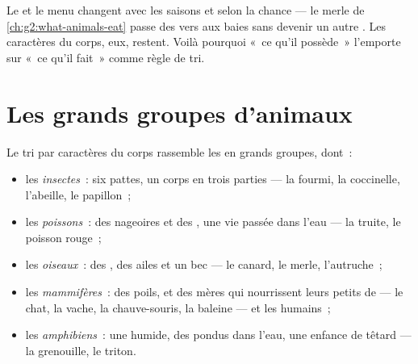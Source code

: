 \begin{remark}\label{rem:g3:sorting-living-things:why}
Le  et le menu changent avec les saisons et selon la
chance --- le merle de \cref{ch:g2:what-animals-eat} passe des vers
aux baies sans devenir un autre . Les caractères du corps,
eux, restent. Voilà pourquoi «~ce qu'il possède~» l'emporte sur
«~ce qu'il fait~» comme règle de tri.
\end{remark}

\section{Les grands groupes d'animaux}

\begin{proposition}\label{prop:g3:sorting-living-things:groups}
Le tri par caractères du corps rassemble les  en grands
groupes, dont~:
\begin{itemize}
  \item les \emph{insectes}~: six pattes, un corps
        en trois parties --- la fourmi, la coccinelle, l'abeille, le
        papillon~;
  \item les \emph{poissons}~: des nageoires et des
        , une vie passée dans l'eau --- la truite, le
        poisson rouge~;
  \item les \emph{oiseaux}~: des , des ailes et
        un bec --- le canard, le merle, l'autruche~;
  \item les \emph{mammifères}~: des poils, et des
        mères qui nourrissent leurs petits de  --- le chat, la
        vache, la chauve-souris, la baleine --- et les humains~;
  \item les \emph{amphibiens}~: une  humide,
        des  pondus dans l'eau, une enfance de têtard --- la
        grenouille, le triton.
\end{itemize}
\end{proposition}
\admitted

